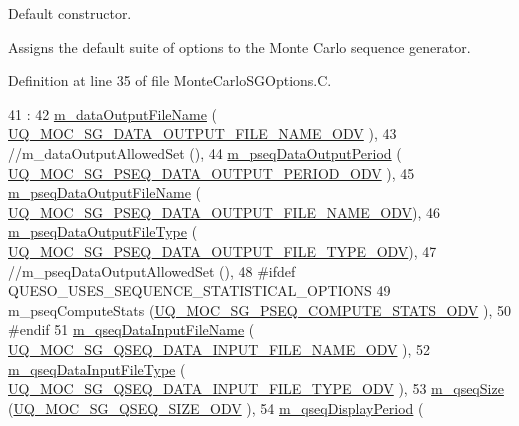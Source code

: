 Default constructor. 

Assigns the default suite of options to the Monte Carlo sequence generator. 

Definition at line 35 of file Monte\-Carlo\-S\-G\-Options.\-C.


\begin{DoxyCode}
41   :
42   \hyperlink{class_q_u_e_s_o_1_1_mc_options_values_a67247424cb0b327fc1b4d6f067ce449c}{m\_dataOutputFileName}         (
      \hyperlink{_monte_carlo_s_g_options_8h_aa5ec0a1554b6c12eaa270131024b29b7}{UQ\_MOC\_SG\_DATA\_OUTPUT\_FILE\_NAME\_ODV}     ),
43 \textcolor{comment}{//m\_dataOutputAllowedSet       (),}
44   \hyperlink{class_q_u_e_s_o_1_1_mc_options_values_a7e7f833d945cdfecac2000196fae1aa8}{m\_pseqDataOutputPeriod}       (
      \hyperlink{_monte_carlo_s_g_options_8h_ad65a13367ee1f95b0ddc5fca2f6dbf95}{UQ\_MOC\_SG\_PSEQ\_DATA\_OUTPUT\_PERIOD\_ODV}   ),
45   \hyperlink{class_q_u_e_s_o_1_1_mc_options_values_a8db3604c003959cb7ae7144a6bb37834}{m\_pseqDataOutputFileName}     (
      \hyperlink{_monte_carlo_s_g_options_8h_a773952b5a26845f50d913143236adbdf}{UQ\_MOC\_SG\_PSEQ\_DATA\_OUTPUT\_FILE\_NAME\_ODV}),
46   \hyperlink{class_q_u_e_s_o_1_1_mc_options_values_a7409d101fbe0676f87754234567dbc33}{m\_pseqDataOutputFileType}     (
      \hyperlink{_monte_carlo_s_g_options_8h_a1f174a6cc09ec8585fabb3c5348d489b}{UQ\_MOC\_SG\_PSEQ\_DATA\_OUTPUT\_FILE\_TYPE\_ODV}),
47 \textcolor{comment}{//m\_pseqDataOutputAllowedSet   (),}
48 \textcolor{preprocessor}{#ifdef QUESO\_USES\_SEQUENCE\_STATISTICAL\_OPTIONS}
49 \textcolor{preprocessor}{}  m\_pseqComputeStats           (\hyperlink{_monte_carlo_s_g_options_8h_ada46f5319f17f130f942366728a385e9}{UQ\_MOC\_SG\_PSEQ\_COMPUTE\_STATS\_ODV}        ),
50 \textcolor{preprocessor}{#endif}
51 \textcolor{preprocessor}{}  \hyperlink{class_q_u_e_s_o_1_1_mc_options_values_aedf79873213bca688ebbf6d873f42e8e}{m\_qseqDataInputFileName}      (
      \hyperlink{_monte_carlo_s_g_options_8h_a362582367efdc7499fbd8a2153acca82}{UQ\_MOC\_SG\_QSEQ\_DATA\_INPUT\_FILE\_NAME\_ODV} ),
52   \hyperlink{class_q_u_e_s_o_1_1_mc_options_values_ac44d90277d7ba36d096ca5254614440d}{m\_qseqDataInputFileType}      (
      \hyperlink{_monte_carlo_s_g_options_8h_ad7dc9950138b8f479608834c5bb662c5}{UQ\_MOC\_SG\_QSEQ\_DATA\_INPUT\_FILE\_TYPE\_ODV} ),
53   \hyperlink{class_q_u_e_s_o_1_1_mc_options_values_a54e8c4bb7d5ffa7755da7d148019c86e}{m\_qseqSize}                   (\hyperlink{_monte_carlo_s_g_options_8h_ae8dc1f788898174d2c827d271d4c72a3}{UQ\_MOC\_SG\_QSEQ\_SIZE\_ODV}                 ),
54   \hyperlink{class_q_u_e_s_o_1_1_mc_options_values_a4ab5a0e5c5d3d47fa15516d98739ae25}{m\_qseqDisplayPeriod}          (

\end{DoxyCode}
